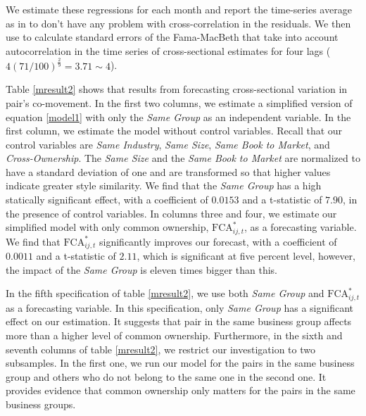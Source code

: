 \documentclass[12pt, a4paper]{article}
\begin{document}
We estimate these regressions for each month and report the time-series average as in \cite{FamaMacBeth} to don't have any problem with cross-correlation in the residuals. We then use  \cite{newey1987hypothesis} to calculate standard errors of the Fama-MacBeth that take into account autocorrelation in the time series of cross-sectional estimates for four lags ($ 4(71/100)^{\frac{2}{9}} = 3.71 \sim 4 $). %

Table \ref{mresult2} shows that results from forecasting cross-sectional variation in pair's co-movement. In the first two columns, we estimate a simplified version of equation \ref{model1} with only the \textit{Same Group} as an independent variable. In the first column, we estimate the model without control variables. Recall that our control variables are \textit{Same Industry}, \textit{Same Size}, \textit{Same Book to Market}, and \textit{Cross-Ownership}. The \textit{Same Size} and the \textit{Same Book to Market} are normalized to have a standard deviation of one and are transformed so that higher values indicate greater style similarity. We find that the \textit{Same Group} has a high statically significant effect, with a coefficient of $0.0153$ and a t-statistic of $7.90$, in the presence of control variables. 
In columns three and four, we estimate our simplified model with only common ownership, $\text{FCA}^*_{ij,t}$, as a forecasting variable. We find that $\text{FCA}^*_{ij,t}$ significantly improves our forecast, with a coefficient of $0.0011$ and a t-statistic of $2.11$, which is significant at five percent level, however, the impact of the \textit{Same Group} is eleven times bigger than this. 

In the fifth specification of table \ref{mresult2}, we use both \textit{Same Group}  and $\text{FCA}^*_{ij,t}$ as a forecasting variable. In this specification, only  \textit{Same Group} has a significant effect on our estimation. It suggests that pair in the same business group affects more than a higher level of common ownership.
 Furthermore, in the sixth and seventh columns of table \ref{mresult2}, we restrict our investigation to two subsamples. In the first one, we run our model for the pairs in the same business group and others who do not belong to the same one in the second one. It provides evidence that common ownership only matters for the pairs in the same business groups. 
 
\end{document}
